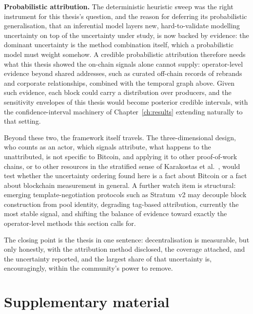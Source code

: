 \documentclass[logo,msc]{infthesis}           %
\begin{document}
\textbf{Probabilistic attribution.} The deterministic heuristic sweep was the
right instrument for this thesis's question, and the reason for deferring its
probabilistic generalisation, that an inferential model layers new,
hard-to-validate modelling uncertainty on top of the uncertainty under study,
is now backed by evidence: the dominant uncertainty is the method
combination itself, which a probabilistic model must weight somehow. A
credible probabilistic attribution therefore needs what this thesis showed the
on-chain signals alone cannot supply: operator-level evidence beyond shared
addresses, such as curated off-chain records of rebrands and corporate
relationships, combined with the temporal graph above. Given such evidence,
each block could carry a distribution over producers, and the sensitivity
envelopes of this thesis would become posterior credible intervals, with
the confidence-interval machinery of Chapter~\ref{ch:results} extending
naturally to that setting.

Beyond these two, the framework itself travels. The three-dimensional design, 
who counts as an actor, which signals attribute, what happens to the
unattributed, is not specific to Bitcoin, and applying it to other
proof-of-work chains, or to other resources in the stratified sense of
Karakostas et al.~\cite{ovezik2022sok}, would test whether the uncertainty
ordering found here is a fact about Bitcoin or a fact about blockchain
measurement in general. A further watch item is structural: emerging
template-negotiation protocols such as Stratum~v2 may decouple block
construction from pool identity, degrading tag-based attribution, currently
the most stable signal, and shifting the balance of evidence toward exactly
the operator-level methods this section calls for.

The closing point is the thesis in one sentence: decentralisation is
measurable, but only honestly, with the attribution method disclosed, the
coverage attached, and the uncertainty reported, and the largest share of
that uncertainty is, encouragingly, within the community's power to remove.






\appendix

\chapter{Supplementary material}
\label{app:supp}
\end{document}
